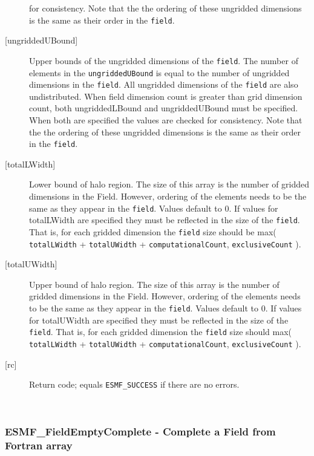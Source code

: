 \begin{description}
   for consistency. Note that the the ordering of
   these ungridded dimensions is the same as their order in the {\tt field}.
   \item [{[ungriddedUBound]}]
   Upper bounds of the ungridded dimensions of the {\tt field}.
   The number of elements in the {\tt ungriddedUBound} is equal to the number of ungridded
   dimensions in the {\tt field}. All ungridded dimensions of the
   {\tt field} are also undistributed. When field dimension count is
   greater than grid dimension count, both ungriddedLBound and ungriddedUBound
   must be specified. When both are specified the values are checked
   for consistency. Note that the the ordering of
   these ungridded dimensions is the same as their order in the {\tt field}.
   \item [{[totalLWidth]}]
   Lower bound of halo region. The size of this array is the number
   of gridded dimensions in the Field. However, ordering of the elements
   needs to be the same as they appear in the {\tt field}. Values default
   to 0. If values for totalLWidth are specified they must be reflected in
   the size of the {\tt field}. That is, for each gridded dimension the
   {\tt field} size should be max( {\tt totalLWidth} + {\tt totalUWidth}
   + {\tt computationalCount}, {\tt exclusiveCount} ).
   \item [{[totalUWidth]}]
   Upper bound of halo region. The size of this array is the number
   of gridded dimensions in the Field. However, ordering of the elements
   needs to be the same as they appear in the {\tt field}. Values default
   to 0. If values for totalUWidth are specified they must be reflected in
   the size of the {\tt field}. That is, for each gridded dimension the
   {\tt field} size should max( {\tt totalLWidth} + {\tt totalUWidth}
   + {\tt computationalCount}, {\tt exclusiveCount} ).
   \item [{[rc]}]
   Return code; equals {\tt ESMF\_SUCCESS} if there are no errors.
   \end{description} 
 
\mbox{}\hrulefill\ 
 
\subsubsection [ESMF\_FieldEmptyComplete] {ESMF\_FieldEmptyComplete - Complete a Field from Fortran array }


